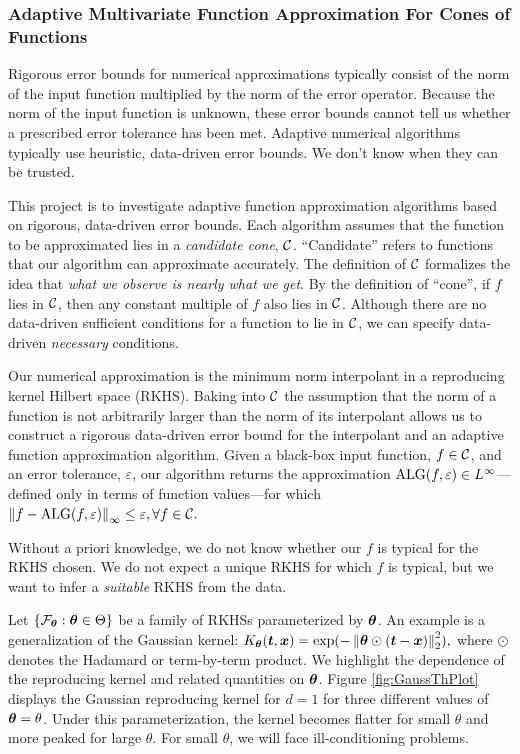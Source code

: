 \subsubsection{Adaptive Multivariate Function Approximation For Cones of Functions}

Rigorous error bounds for numerical approximations typically consist of the norm of the input function multiplied by the norm of the error operator.  Because the norm of the input function is unknown, these error bounds cannot tell us whether a prescribed error tolerance has been met.  Adaptive numerical algorithms typically use heuristic, data-driven error bounds.  We don't know when they can be trusted.

This project is to investigate adaptive function approximation algorithms based on rigorous, data-driven error bounds.  Each algorithm assumes that the function to be approximated lies in a \emph{candidate cone}, $\cc$.  ``Candidate'' refers to functions that our algorithm can approximate accurately.  The definition of $\cc$ formalizes the idea that \emph{what we observe is nearly what we get}.  By the definition of ``cone'', if $f$ lies in $\cc$, then any constant multiple of $f$  also lies in $\cc$.  Although there are no data-driven sufficient conditions for a function to lie in $\calc$, we can specify data-driven \emph{necessary} conditions.

Our numerical approximation is the minimum norm interpolant in a reproducing kernel Hilbert space (RKHS).  Baking into $\cc$ the assumption that the norm of a function is not arbitrarily larger than the norm of its interpolant allows us to construct a rigorous data-driven error bound for the interpolant and an adaptive function approximation algorithm. Given a black-box input function, $f \in \cc$, and an error tolerance, $\varepsilon$, our algorithm returns the approximation $\ALG(f,\varepsilon) \in L^\infty$---defined only in terms of function values---for which 
$
\norm[\infty]{f - \ALG(f,\varepsilon)} \le \varepsilon, \forall f\in \cc.$

Without  a priori knowledge, we do not know whether our $f$ is typical for  the RKHS chosen.  We do not expect a unique RKHS for which $f$ is typical, but we want to infer a \emph{suitable} RKHS from the data.  

Let $\{\calf_{\btheta} : \btheta \in \Theta\}$ be a family of RKHSs parameterized by $\btheta$.  An example is a generalization of the Gaussian kernel:
$
K_\btheta(\bt,\bx) =  \exp(-\norm[2]{\btheta \odot (\bt-\bx)}^2),
$
where $\odot$ denotes the Hadamard or term-by-term product. We highlight the dependence of the reproducing kernel and related quantities on $\btheta$.
Figure \ref{fig:GaussThPlot} displays the Gaussian reproducing kernel for $d=1$ for three different values of $\btheta = \theta$.  Under this parameterization, the kernel becomes flatter for small $\theta$ and more peaked for large $\theta$. For small $\theta$, we will face ill-conditioning problems.

